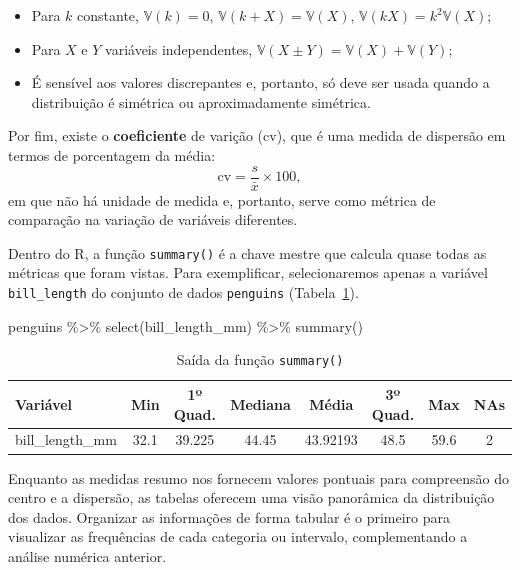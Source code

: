 \documentclass[
  12pt,
  letterpaper,
  DIV=11,
  numbers=noendperiod]{scrreprt}
\newenvironment{Shaded}{\begin{snugshade}}{\end{snugshade}}
\newcommand{\FunctionTok}[1]{\textcolor[rgb]{0.28,0.35,0.67}{#1}}
\newcommand{\NormalTok}[1]{\textcolor[rgb]{0.00,0.23,0.31}{#1}}
\newcommand{\SpecialCharTok}[1]{\textcolor[rgb]{0.37,0.37,0.37}{#1}}
\providecommand{\tightlist}{%
  \setlength{\itemsep}{0pt}\setlength{\parskip}{0pt}}\usepackage{longtable,booktabs,array}
\theoremstyle{definition}
\theoremstyle{exemplo}
\begin{document}
\begin{itemize}
\tightlist
\item
  Para \(k\) constante, \(\mathbb{V}(k) = 0\),
  \(\mathbb{V}(k + X) = \mathbb{V}(X)\),
  \(\mathbb{V}(kX) = k^2\mathbb{V}(X)\);
\item
  Para \(X\) e \(Y\) variáveis independentes,
  \(\mathbb{V}(X \pm Y) = \mathbb{V}(X) + \mathbb{V}(Y)\);
\item
  É sensível aos valores discrepantes e, portanto, só deve ser usada
  quando a distribuição é simétrica ou aproximadamente simétrica.
\end{itemize}

Por fim, existe o \textbf{coeficiente} de varição (\(\text{cv}\)), que é
uma medida de dispersão em termos de porcentagem da média:
\[\text{cv} = \frac{s}{\bar{x}}\times 100,\] em que não há unidade de
medida e, portanto, serve como métrica de comparação na variação de
variáveis diferentes.

Dentro do R, a função \texttt{summary()} é a chave mestre que calcula
quase todas as métricas que foram vistas. Para exemplificar,
selecionaremos apenas a variável \texttt{bill\_length} do conjunto de
dados \texttt{penguins} (Tabela~\ref{tbl-summary}).

\begin{Shaded}
\begin{Highlighting}[]
\NormalTok{penguins }\SpecialCharTok{\%\textgreater{}\%} 
  \FunctionTok{select}\NormalTok{(bill\_length\_mm) }\SpecialCharTok{\%\textgreater{}\%} 
  \FunctionTok{summary}\NormalTok{()}
\end{Highlighting}
\end{Shaded}

\begin{longtable}[t]{lccccccc}

\caption{\label{tbl-summary}Saída da função \texttt{summary()}}

\tabularnewline

\toprule
Variável & Min & 1º Quad. & Mediana & Média & 3º Quad. & Max & NAs\\
\midrule
bill\_length\_mm & 32.1 & 39.225 & 44.45 & 43.92193 & 48.5 & 59.6 & 2\\
\bottomrule

\end{longtable}

Enquanto as medidas resumo nos fornecem valores pontuais para
compreensão do centro e a dispersão, as tabelas oferecem uma visão
panorâmica da distribuição dos dados. Organizar as informações de forma
tabular é o primeiro para visualizar as frequências de cada categoria ou
intervalo, complementando a análise numérica anterior.
\end{document}
